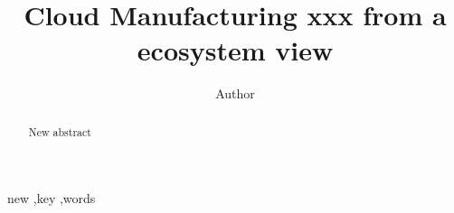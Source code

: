 
\title{Cloud Manufacturing xxx from a ecosystem view
}

\author[label1]{Author}
\address[label1]{ZJU}
\begin{abstract}
New abstract


\end{abstract}

\begin{keyword}
new \sep key \sep words
\end{keyword}
